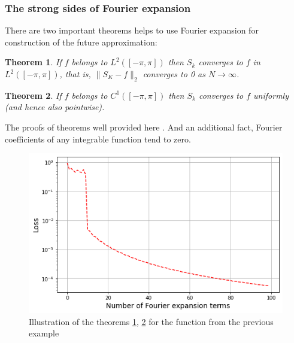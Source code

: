 \subsubsection{The strong sides of Fourier expansion}
There are two important theorems helps to use Fourier expansion for construction of the future approximation:

\newtheorem{theorem}{Theorem}[chapter]
\begin{theorem}
\label{convergence-l2-norm}
If $f$ belongs to $L^{2}(\left[-\pi ,\pi \right])$ then $S_k$ converges to $f$ in $L^{2}(\left[-\pi ,\pi \right])$, that is, $\|S_K - f\|_{2}$ converges to 0 as $N \rightarrow \infty$.
\end{theorem}
\begin{theorem}
\label{convergence-pointwise}
If $f$ belongs to $C^1(\left[-\pi ,\pi \right])$ then $S_k$ converges to $f$ uniformly (and hence also pointwise).
\end{theorem}
The proofs of theorems well provided here \cite{fourierintro}. And an additional fact, Fourier coefficients of any integrable function tend to zero. 


\begin{figure}[h]
	\centering
	\includegraphics[width=\textwidth]{images/chapter2/fourier_quality.png}
	\caption{Illustration of the theorems \ref{convergence-l2-norm}, \ref{convergence-pointwise} for the function from the previous example}
	\label{fig:fourier_quality}
\end{figure}